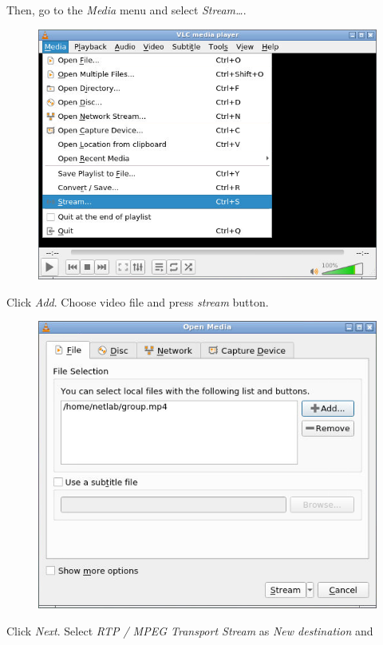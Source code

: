 \documentclass{../UTNetLab}
\begin{document}
    Then, go to the \textit{Media} menu and select \textit{Stream\ldots}.
    \begin{figure}[H]
        \centering
        \includegraphics[scale=1.6]{img/open-stream}
    \end{figure}
    Click \textit{Add}. Choose video file  and press \textit{stream} button.
    \begin{figure}[H]
        \centering
        \includegraphics[scale=1.6]{img/stream}
    \end{figure}
    Click \textit{Next}.
    Select \textit{RTP / MPEG Transport Stream} as \textit{New destination} and
\end{document}
